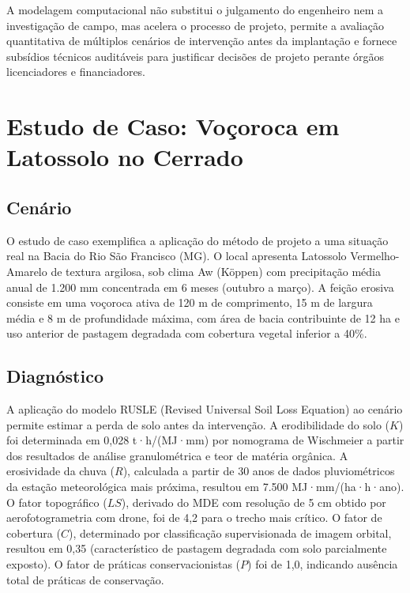 \documentclass[
  portuguese,
  11pt,
  a4paper,
  open=any]{scrbook}
\begin{document}
A modelagem computacional não substitui o julgamento do engenheiro nem a
investigação de campo, mas acelera o processo de projeto, permite a
avaliação quantitativa de múltiplos cenários de intervenção antes da
implantação e fornece subsídios técnicos auditáveis para justificar
decisões de projeto perante órgãos licenciadores e financiadores.

\section{Estudo de Caso: Voçoroca em Latossolo no
Cerrado}\label{estudo-de-caso-vouxe7oroca-em-latossolo-no-cerrado}

\subsection{Cenário}\label{cenuxe1rio}

O estudo de caso exemplifica a aplicação do método de projeto a uma
situação real na Bacia do Rio São Francisco (MG). O local apresenta
Latossolo Vermelho-Amarelo de textura argilosa, sob clima Aw (Köppen)
com precipitação média anual de 1.200 mm concentrada em 6 meses (outubro
a março). A feição erosiva consiste em uma voçoroca ativa de 120 m de
comprimento, 15 m de largura média e 8 m de profundidade máxima, com
área de bacia contribuinte de 12 ha e uso anterior de pastagem degradada
com cobertura vegetal inferior a 40\%.

\subsection{Diagnóstico}\label{diagnuxf3stico}

A aplicação do modelo RUSLE (Revised Universal Soil Loss Equation) ao
cenário permite estimar a perda de solo antes da intervenção. A
erodibilidade do solo (\(K\)) foi determinada em 0,028 t·h/(MJ·mm) por
nomograma de Wischmeier a partir dos resultados de análise
granulométrica e teor de matéria orgânica. A erosividade da chuva
(\(R\)), calculada a partir de 30 anos de dados pluviométricos da
estação meteorológica mais próxima, resultou em 7.500 MJ·mm/(ha·h·ano).
O fator topográfico (\(LS\)), derivado do MDE com resolução de 5 cm
obtido por aerofotogrametria com drone, foi de 4,2 para o trecho mais
crítico. O fator de cobertura (\(C\)), determinado por classificação
supervisionada de imagem orbital, resultou em 0,35 (característico de
pastagem degradada com solo parcialmente exposto). O fator de práticas
conservacionistas (\(P\)) foi de 1,0, indicando ausência total de
práticas de conservação.
\end{document}

